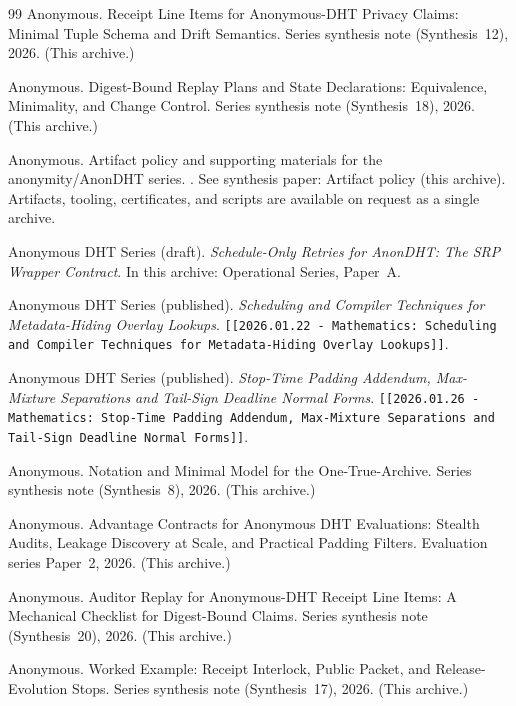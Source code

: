 \documentclass[11pt]{article}
\begin{document}
\begin{thebibliography}{99}
Anonymous.
\newblock Receipt Line Items for Anonymous-DHT Privacy Claims: Minimal Tuple Schema and Drift Semantics.
\newblock Series synthesis note (Synthesis~12), 2026. (This archive.)

Anonymous.
\newblock Digest-Bound Replay Plans and State Declarations: Equivalence, Minimality, and Change Control.
\newblock Series synthesis note (Synthesis~18), 2026. (This archive.)

Anonymous.
\newblock Artifact policy and supporting materials for the anonymity/AnonDHT series.
.
\newblock See synthesis paper: Artifact policy (this archive). Artifacts, tooling, certificates, and scripts are available on request as a single archive.



Anonymous DHT Series (draft).
\emph{Schedule-Only Retries for AnonDHT: The SRP Wrapper Contract}.
In this archive: Operational Series, Paper~A.

Anonymous DHT Series (published).
\emph{Scheduling and Compiler Techniques for Metadata-Hiding Overlay Lookups}.
\texttt{[[2026.01.22 - Mathematics: Scheduling and Compiler Techniques for Metadata-Hiding Overlay Lookups]]}.

Anonymous DHT Series (published).
\emph{Stop-Time Padding Addendum, Max-Mixture Separations and Tail-Sign Deadline Normal Forms}.
\texttt{[[2026.01.26 - Mathematics: Stop-Time Padding Addendum, Max-Mixture Separations and Tail-Sign Deadline Normal Forms]]}.


Anonymous.
\newblock Notation and Minimal Model for the One-True-Archive.
\newblock Series synthesis note (Synthesis~8), 2026. (This archive.)


Anonymous.
\newblock Advantage Contracts for Anonymous DHT Evaluations: Stealth Audits, Leakage Discovery at Scale, and Practical Padding Filters.
\newblock Evaluation series Paper~2, 2026. (This archive.)

Anonymous.
\newblock Auditor Replay for Anonymous-DHT Receipt Line Items: A Mechanical Checklist for Digest-Bound Claims.
\newblock Series synthesis note (Synthesis~20), 2026. (This archive.)

Anonymous.
\newblock Worked Example: Receipt Interlock, Public Packet, and Release-Evolution Stops.
\newblock Series synthesis note (Synthesis~17), 2026. (This archive.)


\end{thebibliography}
\end{document}
